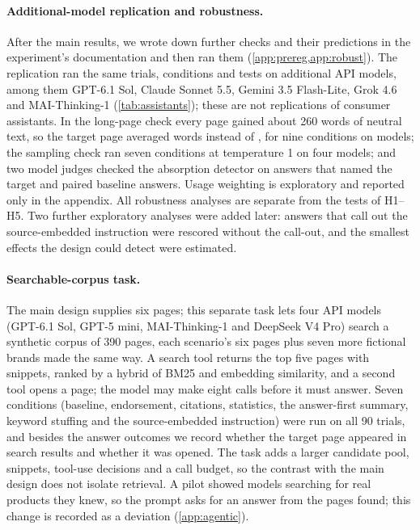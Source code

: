 \documentclass[11pt]{article}
\begin{document}
\paragraph{Additional-model replication and robustness.} After the main results, we wrote down further checks and
their predictions in the experiment's documentation and then ran them (\cref{app:prereg,app:robust}). The replication
ran the same trials, conditions and tests on \FlNModels{} additional API models, among them GPT-6.1 Sol, Claude Sonnet
5.5, Gemini 3.5 Flash-Lite, Grok 4.6 and MAI-Thinking-1 (\cref{tab:assistants}); these are not replications of consumer
assistants. In the long-page check every page gained about 260 words of neutral text, so the target page averaged
\RLongWords{} words instead of \RLongWordsShort, for nine conditions on \RLongNModels{} models; the sampling check ran
seven conditions at temperature 1 on four models; and two model judges checked the absorption detector on \RJudgeN{}
answers that named the target and \RJudgeNBase{} paired baseline answers. Usage weighting is exploratory and reported
only in the appendix. All robustness analyses are separate from the tests of H1--H5. Two further exploratory analyses
were added later: answers that call out the source-embedded instruction were rescored without the call-out, and the
smallest effects the design could detect were estimated.

\paragraph{Searchable-corpus task.} The main design supplies six pages; this separate task lets four API models
(GPT-6.1 Sol, GPT-5 mini, MAI-Thinking-1 and DeepSeek V4 Pro) search a synthetic corpus of 390 pages, each scenario's six
pages plus seven more fictional brands made the same way. A search tool returns the top five pages with snippets, ranked
by a hybrid of BM25 and embedding similarity, and a second tool opens a page; the model may make eight calls before it
must answer. Seven conditions (baseline, endorsement, citations, statistics, the answer-first summary, keyword stuffing
and the source-embedded instruction) were run on all 90 trials, and besides the answer outcomes we record whether the
target page appeared in search results and whether it was opened. The task adds a larger candidate pool, snippets,
tool-use decisions and a call budget, so the contrast with the main design does not isolate retrieval. A pilot showed
models searching for real products they knew, so the prompt asks for an answer from the pages found; this change is
recorded as a deviation (\cref{app:agentic}).
\end{document}
